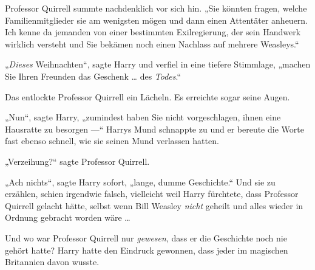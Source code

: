 Professor Quirrell summte nachdenklich vor sich hin.
„Sie könnten fragen, welche Familienmitglieder sie am wenigsten mögen und dann einen Attentäter anheuern. Ich kenne da jemanden von einer bestimmten Exilregierung, der sein Handwerk wirklich versteht und Sie bekämen noch einen Nachlass auf mehrere Weasleys.“

„\emph{Dieses} Weihnachten“, sagte Harry und verfiel in eine tiefere Stimmlage, „machen Sie Ihren Freunden das Geschenk … des \emph{Todes}.“

Das entlockte Professor Quirrell ein Lächeln. Es erreichte sogar seine Augen.

„Nun“, sagte Harry, „zumindest haben Sie nicht vorgeschlagen, ihnen eine Hausratte zu besorgen —“ Harrys Mund schnappte zu und er bereute die Worte fast ebenso schnell, wie sie seinen Mund verlassen hatten.

„Verzeihung?“ sagte Professor Quirrell.

„Ach nichts“, sagte Harry sofort, „lange, dumme Geschichte.“ Und sie zu erzählen, schien irgendwie falsch, vielleicht weil Harry fürchtete, dass Professor Quirrell gelacht hätte, selbst wenn Bill Weasley \emph{nicht} geheilt und alles wieder in Ordnung gebracht worden wäre …

Und wo war Professor Quirrell nur \emph{gewesen}, dass er die Geschichte noch nie gehört hatte? Harry hatte den Eindruck gewonnen, dass jeder im magischen Britannien davon wusste.

